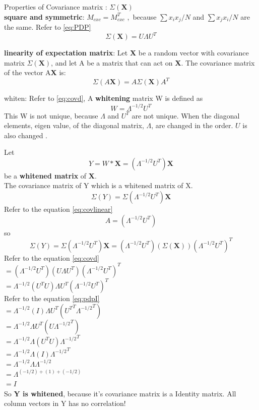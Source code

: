 \documentclass[a4paper,12pt]{article}
\begin{document}
\begin{compactitem}
\item Properties of Covariance matrix : $\Sigma(\textbf{X})$ \\
\textbf{square and symmetric}: $M_{cxc}=M_{cxc}^T$ ,\ because $\sum x_i x_j / N$ and $\sum x_j x_i / N$ are the same. Refer to \eqref{eq:PDP}
\begin{equation}
\label{eq:covd}
\Sigma(\textbf{X}) = U\Lambda U^T
\end{equation}

\textbf{linearity of expectation matrix}: Let \textbf{X} be a random vector with covariance matrix
$\Sigma(\textbf{X})$, and let A be a matrix that can act on \textbf{X}. The covariance matrix of the vector A\textbf{X} is:
\begin{equation}
\label{eq:covlinear}
\Sigma(A\textbf{X}) = A\Sigma(\textbf{X})A^{T}
\end{equation}

\item whiten: Refer to \eqref{eq:covd},  A \textbf{whitening} matrix W is defined as
\begin{equation}
\label{eq:whitem}
W=\Lambda^{-1/2} U^{T}
\end{equation}
This W is not unique, because $\Lambda$ and $U^T$ are not unique.
When the diagonal elements, eigen value, of the diagonal matrix, $\Lambda$, are changed in the order.
$U$ is also changed .

Let
\begin{equation}
\label{eq:whitened}
Y = W*\textbf{X}= (\Lambda^{-1/2} U^{T}) \textbf{X}
\end{equation}
be a \textbf{whitened matrix} of \textbf{X}.\\
The covariance matrix of Y which is a whitened matrix of X.
\[
\Sigma (Y)=\Sigma (\Lambda^{-1/2} U^{T}) \textbf{X}
\]
Refer to the equation \eqref{eq:covlinear}
\[
A=(\Lambda^{-1/2} U^{T})
\]
so
\[
\Sigma (Y)=\Sigma (\Lambda^{-1/2} U^{T}) \textbf{X}=
(\Lambda^{-1/2} U^{T})(\Sigma (\textbf{X})) (\Lambda^{-1/2} U^{T})^{T}
\]
Refer to the equation \eqref{eq:covd}\\
$=(\Lambda^{-1/2} U^{T}) (U \Lambda U^{T}) (\Lambda^{-1/2} U^{T}) ^T$\\
$=\Lambda^{-1/2} (U^{T}  U) \Lambda U^{T} (\Lambda^{-1/2} U^{T}) ^T$\\
Refer to the equation \eqref{eq:pdpI}\\
$=\Lambda^{-1/2} (I) \Lambda U^{T} ({U^{T}}^T{\Lambda^{-1/2}}^T)$\\
$=\Lambda^{-1/2} \Lambda U^{T} (U{\Lambda^{-1/2}}^T)$\\
$=\Lambda^{-1/2} \Lambda (U^{T} U) {\Lambda^{-1/2}}^T$\\
$=\Lambda^{-1/2} \Lambda (I) {\Lambda^{-1/2}}^T$\\
$=\Lambda^{-1/2} \Lambda \Lambda^{-1/2}$\\
$=\Lambda^{(-1/2) + (1) + (-1/2)}$\\
$=I$\\
So \textbf{Y is whitened}, because it's covariance matrix is a Identity matrix.
All column vectors in Y has no correlation!


\end{compactitem}
\end{document}
